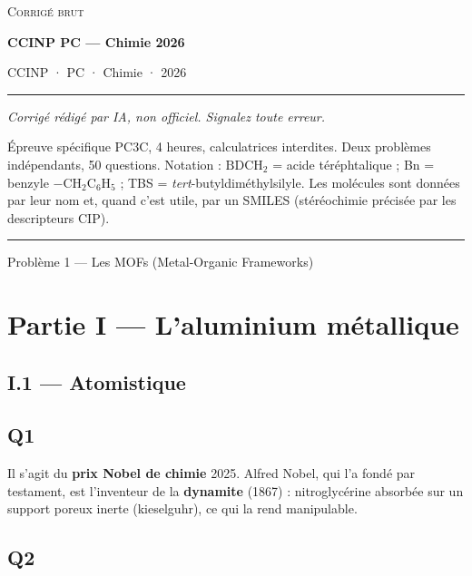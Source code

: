 \documentclass[11pt,a4paper]{article}
\begin{document}
\thispagestyle{plain}
\begin{center}
  {\small\scshape Corrigé brut}\par\smallskip
  {\LARGE\bfseries CCINP PC — Chimie 2026\par}\medskip
  {\large CCINP · PC · Chimie · 2026\par}
\end{center}
\vspace{2pt}\hrule\vspace{8pt}

\emph{Corrigé rédigé par IA, non officiel. Signalez toute erreur.}

Épreuve spécifique PC3C, 4 heures, calculatrices interdites. Deux problèmes indépendants, 50 questions. Notation : \(\mathrm{BDCH_2}\) = acide téréphtalique ; Bn = benzyle \(-\mathrm{CH_2C_6H_5}\) ; TBS = \emph{tert}-butyldiméthylsilyle. Les molécules sont données par leur nom et, quand c'est utile, par un SMILES (stéréochimie précisée par les descripteurs CIP).

\begin{center}\rule{0.5\linewidth}{0.5pt}\end{center}

Problème 1 --- Les MOFs (Metal-Organic Frameworks)

\hypertarget{partie-i-laluminium-muxe9tallique}{%
\section{Partie I --- L'aluminium métallique}\label{partie-i-laluminium-muxe9tallique}}

\hypertarget{i.1-atomistique}{%
\subsection{I.1 --- Atomistique}\label{i.1-atomistique}}

\hypertarget{q1}{%
\subsection{Q1}\label{q1}}

Il s'agit du \textbf{prix Nobel de chimie} 2025. Alfred Nobel, qui l'a fondé par testament, est l'inventeur de la \textbf{dynamite} (1867) : nitroglycérine absorbée sur un support poreux inerte (kieselguhr), ce qui la rend manipulable.

\hypertarget{q2}{%
\subsection{Q2}\label{q2}}
\end{document}
